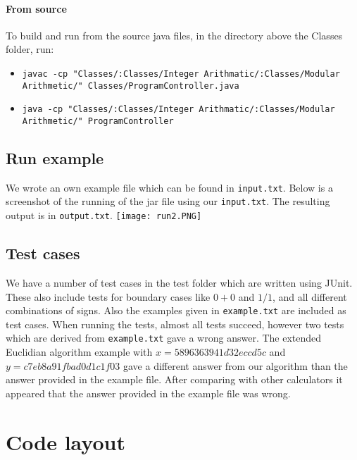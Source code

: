 \documentclass[a4paper]{article}
\begin{document}
\paragraph{From source}

To build and run from the source java files, in the directory above the Classes folder, run:

\begin{itemize}
\item \texttt{javac -cp "Classes/:Classes/Integer Arithmatic/:Classes/Modular Arithmetic/" Classes/ProgramController.java}
\item \texttt{java -cp "Classes/:Classes/Integer Arithmatic/:Classes/Modular Arithmetic/" ProgramController}
\end{itemize}



\subsection{Run example}

We wrote an own example file which can be found in \texttt{input.txt}.
Below is a screenshot of the running of the jar file using our \texttt{input.txt}.
The resulting output is in \texttt{output.txt}.
\texttt{[image: run2.PNG]}


\subsection{Test cases}

We have a number of test cases in the test folder which are written using JUnit.
These also include tests for boundary cases like $0+0$ and $1/1$, and all different combinations of signs.
Also the examples given in \texttt{example.txt} are included as test cases.
When running the tests, almost all tests succeed, however two tests which are derived from \texttt{example.txt} gave a wrong answer.
The extended Euclidian algorithm example with $x=5896363941d32eccd5c$ and $y=c7eb8a91fbad0d1c1f03$ gave a different answer from our algorithm than
the answer provided in the example file.
After comparing with other calculators it appeared that the answer provided in the example file was wrong.




\section{Code layout}
\end{document}
